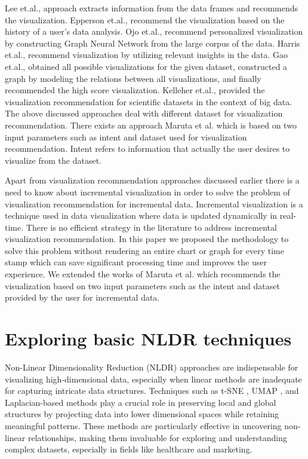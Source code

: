 Lee et.al., \cite{lee2021lux} approach extracts information from the data frames and recommends the visualization. Epperson et.al., \cite{epperson2022leveraging} recommend the visualization based on the history of a user’s data analysis. Ojo et.al., \cite{ojo2022visgnn} recommend personalized visualization by constructing Graph Neural Network from the large corpus of the data. Harris et.al., \cite{harris2021insight} recommend visualization by utilizing relevant insights in the data. Gao et.al., \cite{gao2021vizgrank} obtained all possible visualizations for the given dataset, constructed a graph by modeling the relations between all visualizations, and finally recommended the high score visualization. Kelleher et.al., \cite{kelleher2021introductory} provided the visualization recommendation for scientific datasets in the context of big data. 
The above discussed approaches deal with different dataset for visualization recommendation. There exists an approach Maruta et al. \cite{maruta2021intent}  which is based on two input parameters such as intent and dataset used for visualization recommendation. Intent refers to information that actually the user desires to visualize from the dataset.



Apart from visualization recommendation approaches discussed earlier there is a need to know about incremental visualization in order to solve the problem of visualization recommendation for incremental data. Incremental visualization \cite{schulz2015enhanced} is a technique used in data visualization where data is updated dynamically in real-time. There is no efficient strategy in the literature to address incremental visualization recommendation. In this paper we proposed the methodology to solve this problem without rendering an entire chart or graph for every time stamp which can save significant processing time and improves the user experience. We extended the works of Maruta et al. \cite{maruta2021intent} which recommends the visualization based on two input parameters such as the intent and dataset provided by the user for incremental data.

\section{Exploring basic NLDR techniques}
Non-Linear Dimensionality Reduction (NLDR) approaches are indispensable for visualizing high-dimensional data, especially when linear methods are inadequate for capturing intricate data
structures. Techniques such as t-SNE \cite{tsne}, UMAP \cite{umap_reference}, and Laplacian-based methods \cite{belkin2001laplacian} \cite{sun2023laplacian} play a crucial role in preserving local and global structures by projecting data into lower dimensional
spaces while retaining meaningful patterns. These methods are particularly effective in
uncovering non-linear relationships, making them invaluable for exploring and understanding
complex datasets, especially in fields like healthcare and marketing.


